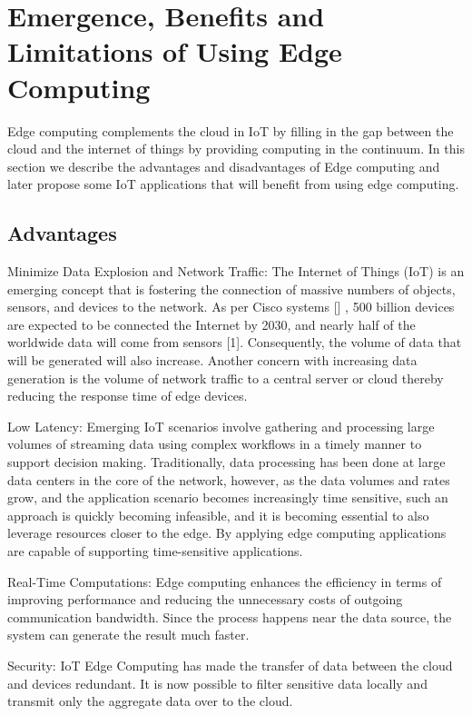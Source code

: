 \section{Emergence, Benefits and Limitations of Using Edge Computing}
Edge computing complements the cloud in IoT by filling in the gap between the cloud and the internet of things by providing computing in the continuum. In this section we describe the advantages and disadvantages of Edge computing and later propose some IoT applications that will benefit from using edge computing.

\subsection{Advantages}

Minimize Data Explosion and Network Traffic: The Internet of Things (IoT) is an emerging concept that is fostering the connection of massive numbers of objects, sensors, and devices to the network. As per Cisco systems [] , 500 billion devices are expected to be connected the Internet by 2030, and nearly half of the worldwide data will come from sensors [1]. Consequently, the volume of data that will be generated will also increase. Another concern with increasing data generation is the volume of network traffic to a central server or cloud thereby reducing the response time of edge devices.

Low Latency: Emerging IoT scenarios involve gathering and processing large volumes of streaming data using complex workflows in a timely manner to support decision making. Traditionally, data processing has been done at large data centers in the core of the network, however, as the data volumes and rates grow, and the application scenario becomes increasingly time sensitive, such an approach is quickly becoming infeasible, and it is becoming essential to also leverage resources closer to the edge. By applying edge computing applications are capable of supporting time-sensitive applications.

Real-Time Computations: Edge computing enhances the efficiency in terms of improving performance and reducing the unnecessary costs of outgoing communication bandwidth. Since the process happens near the data source, the system can generate the result much faster.

Security: IoT Edge Computing has made the transfer of data between the cloud and devices redundant. It is now possible to filter sensitive data locally and transmit only the aggregate data over to the cloud.


